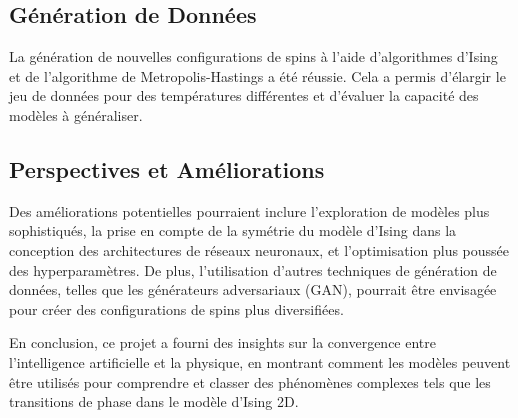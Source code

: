 \documentclass[11pt, parskip=half]{scrartcl} %
\begin{document}
\subsection*{Génération de Données}

La génération de nouvelles configurations de spins à l'aide d'algorithmes d'Ising et de l'algorithme de Metropolis-Hastings a été réussie. Cela a permis d'élargir le jeu de données pour des températures différentes et d'évaluer la capacité des modèles à généraliser.

\subsection*{Perspectives et Améliorations}

Des améliorations potentielles pourraient inclure l'exploration de modèles plus sophistiqués, la prise en compte de la symétrie du modèle d'Ising dans la conception des architectures de réseaux neuronaux, et l'optimisation plus poussée des hyperparamètres. De plus, l'utilisation d'autres techniques de génération de données, telles que les générateurs adversariaux (GAN), pourrait être envisagée pour créer des configurations de spins plus diversifiées.

En conclusion, ce projet a fourni des insights sur la convergence entre l'intelligence artificielle et la physique, en montrant comment les modèles peuvent être utilisés pour comprendre et classer des phénomènes complexes tels que les transitions de phase dans le modèle d'Ising 2D.



\nocite{noauthor_ising_2023}
\nocite{diu_stat}
\nocite{Ising_auto}

\appendix
\end{document}
